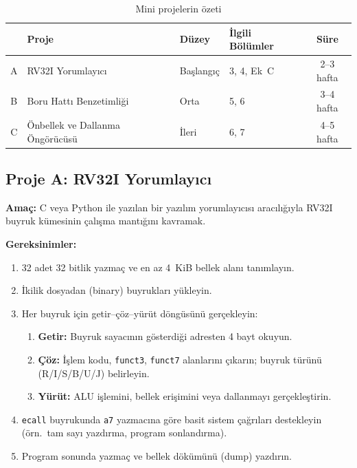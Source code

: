 \begin{table}[H]
\centering
\caption[Mini proje özet tablosu]{Mini projelerin özeti}
\label{tab:ekd-projeler}
\begin{tabular}{@{}clllc@{}}
\toprule
 & \textbf{Proje} & \textbf{Düzey} & \textbf{İlgili Bölümler} & \textbf{Süre} \\
\midrule
A & RV32I Yorumlayıcı          & Başlangıç & 3, 4, Ek~C     & 2--3 hafta \\
B & Boru Hattı Benzetimliği     & Orta      & 5, 6           & 3--4 hafta \\
C & Önbellek ve Dallanma Öngörücüsü & İleri & 6, 7      & 4--5 hafta \\
\bottomrule
\end{tabular}
\end{table}


\subsection{Proje A: RV32I Yorumlayıcı}
\label{sec:ekd-proje-a}

\textbf{Amaç:} C veya Python ile yazılan bir yazılım yorumlayıcısı aracılığıyla RV32I buyruk kümesinin çalışma mantığını kavramak.\smallskip

\textbf{Gereksinimler:}
\begin{enumerate}[leftmargin=2em]
    \item 32 adet 32 bitlik yazmaç ve en az 4~KiB bellek alanı tanımlayın.
    \item İkilik dosyadan (binary) buyrukları yükleyin.
    \item Her buyruk için getir--çöz--yürüt döngüsünü gerçekleyin:
    \begin{enumerate}[label=\alph*)]
        \item \textbf{Getir:} Buyruk sayacının gösterdiği adresten 4 bayt okuyun.
        \item \textbf{Çöz:} İşlem kodu, \texttt{funct3}, \texttt{funct7} alanlarını çıkarın; buyruk türünü (R/I/S/B/U/J) belirleyin.
        \item \textbf{Yürüt:} ALU işlemini, bellek erişimini veya dallanmayı gerçekleştirin.
    \end{enumerate}
    \item \texttt{ecall} buyrukunda \texttt{a7} yazmacına göre basit sistem çağrıları destekleyin (örn.\ tam sayı yazdırma, program sonlandırma).
    \item Program sonunda yazmaç ve bellek dökümünü (dump) yazdırın.
\end{enumerate}

